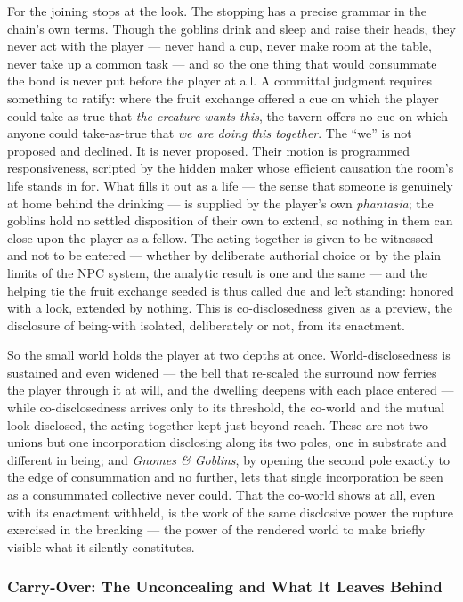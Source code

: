 For the joining stops at the look. The stopping has a precise grammar in the chain's own terms. Though the goblins drink and sleep and raise their heads, they never act with the player — never hand a cup, never make room at the table, never take up a common task — and so the one thing that would consummate the bond is never put before the player at all. A committal judgment requires something to ratify: where the fruit exchange offered a cue on which the player could take-as-true that \textit{the creature wants this}, the tavern offers no cue on which anyone could take-as-true that \textit{we are doing this together}. The ``we'' is not proposed and declined. It is never proposed. Their motion is programmed responsiveness, scripted by the hidden maker whose efficient causation the room's life stands in for. What fills it out as a life — the sense that someone is genuinely at home behind the drinking — is supplied by the player's own \textit{phantasia}; the goblins hold no settled disposition of their own to extend, so nothing in them can close upon the player as a fellow. The acting-together is given to be witnessed and not to be entered — whether by deliberate authorial choice or by the plain limits of the NPC system, the analytic result is one and the same — and the helping tie the fruit exchange seeded is thus called due and left standing: honored with a look, extended by nothing. This is co-disclosedness given as a preview, the disclosure of being-with isolated, deliberately or not, from its enactment.

So the small world holds the player at two depths at once. World-disclosedness is sustained and even widened — the bell that re-scaled the surround now ferries the player through it at will, and the dwelling deepens with each place entered — while co-disclosedness arrives only to its threshold, the co-world and the mutual look disclosed, the acting-together kept just beyond reach. These are not two unions but one incorporation disclosing along its two poles, one in substrate and different in being; and \textit{Gnomes \& Goblins}, by opening the second pole exactly to the edge of consummation and no further, lets that single incorporation be seen as a consummated collective never could. That the co-world shows at all, even with its enactment withheld, is the work of the same disclosive power the rupture exercised in the breaking — the power of the rendered world to make briefly visible what it silently constitutes.

\subsubsection*{Carry-Over: The Unconcealing and What It Leaves Behind}

